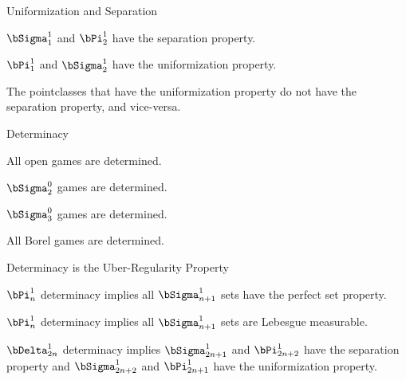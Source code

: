 \documentclass{beamer}
\begin{document}
\begin{frame}{Uniformization and Separation}

\begin{theorem}[Luzin, 1927]
$\bSigma^1_1$ and $\bPi^1_2$ have the separation property.
\end{theorem}


\begin{theorem}[Kondo, 1939]
$\bPi^1_1$ and $\bSigma^1_2$ have the uniformization property.
\end{theorem}

\begin{fact}
The pointclasses that have the uniformization property do not have the
separation property, and vice-versa.
\end{fact}

\end{frame}

\begin{frame}{Determinacy}

\begin{theorem}
All open games are determined.
\end{theorem}

\begin{theorem}[Wolf, 1955]
$\bSigma^0_2$ games are determined.
\end{theorem}

\begin{theorem}[Davis, 1964]
$\bSigma^0_3$ games are determined.
\end{theorem}

\begin{theorem}[Matin, 1975]
All Borel games are determined.
\end{theorem}

\end{frame}


\begin{frame}{Determinacy is the Uber-Regularity Property}

\begin{theorem}
$\bPi^1_n$ determinacy implies all $\bSigma^1_{n+1}$ sets have the perfect set
property.
\end{theorem}

\begin{theorem}
$\bPi^1_n$ determinacy implies all $\bSigma^1_{n+1}$ sets are Lebesgue measurable.
\end{theorem}

\begin{theorem}[Moschovakis, 1971]
$\bDelta^1_{2n}$ determinacy implies $\bSigma^1_{2n+1}$ and $\bPi^1_{2n+2}$ have the separation property
and $\bSigma^1_{2n+2}$ and $\bPi^1_{2n+1}$ have the uniformization property.
\end{theorem}

\end{frame}
\end{document}
